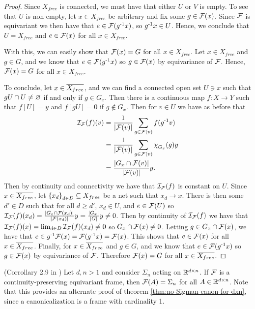 \begin{theorem}
\begin{proof}
        Since $X_{free}$ is connected, we must have that either $U$ or $V$ is empty.
        To see that $U$ is non-empty, let $x \in X_{free}$ be arbitrary and fix some $g \in \mathcal{F}(x)$.
        Since $\mathcal{F}$ is equivariant we then have that $e \in \mathcal{F}(g^{\text{-}1} x)$, so $g^{\text{-}1} x \in U$.
        Hence, we conclude that $U = X_{free}$ and $e \in \mathcal{F}(x)$ for all $x \in X_{free}$.
        
        With this, we can easily show that $\mathcal{F}(x) = G$ for all $x \in X_{free}$.
        Let $x \in X_{free}$ and $g \in G$, and we know that $e \in \mathcal{F}(g^{\text{-}1} x)$ so $g \in \mathcal{F}(x)$ by equivariance of $\mathcal{F}$.
        Hence, $\mathcal{F}(x) = G$ for all $x \in X_{free}$.
        
        To conclude, let $x \in \overline{X_{free}}$, and we can find a connected open set $U \ni x$ such that $gU \cap U \neq \varnothing$ if and only if $g \in G_x$.
        Then there is a continuous map $f : X \to Y$ such that $f[U] = y$ and $f[gU] = 0$ if $g \not\in G_x$.
        Then for $v \in U$ we have as before that
        \begin{align*}
            \mathcal{I}_{\mathcal{F}} (f) (v)
            &= \frac{1}{\left| \mathcal{F}(v) \right|} \sum_{g \in \mathcal{F}(v)} f(g^{\text{-}1} v) \\
            &= \frac{1}{\left| \mathcal{F}(v) \right|} \sum_{g \in \mathcal{F}(v)} \operatorname{\chi}_{G_x}(g) y \\
            &= \frac{\left| G_x \cap \mathcal{F}(v) \right|}{\left| \mathcal{F}(v) \right|} y.
        \end{align*}
        Then by continuity and connectivity we have that $\mathcal{I}_{\mathcal{F}} (f)$ is constant on $U$.
        Since $x \in \overline{X_{free}}$, let $\left\{ x_d \right\}_{d \in D} \subseteq X_{free}$ be a net such that $x_d \to x$.
        There is then some $d' \in D$ such that for all $d \geq d'$, $x_d \in U$, and $e \in \mathcal{F}(U)$ so $\mathcal{I}_{\mathcal{F}} (f) (x_d) = \frac{\left| G_x \cap \mathcal{F}(x_d) \right|}{\left| \mathcal{F}(x_d) \right|}y = \frac{\left| G_x \right|}{\left| G \right|}y \neq 0$.
        Then by continuity of $\mathcal{I}_{\mathcal{F}} (f)$ we have that $\mathcal{I}_{\mathcal{F}} (f) (x) = \lim_{d \in D} \mathcal{I}_{\mathcal{F}} (f) (x_d) \neq 0$ so $G_x \cap \mathcal{F}(x) \neq 0$.
        Letting $g \in G_x \cap \mathcal{F}(x)$, we have that $e \in g^{\text{-}1}\mathcal{F}(x) = \mathcal{F}(g^{\text{-}1}x) = \mathcal{F}(x)$.
        This shows that $e \in \mathcal{F}(x)$ for all $x \in \overline{X_{free}}$.
        Finally, for $x \in \overline{X_{free}}$ and $g \in G$, and we know that $e \in \mathcal{F}(g^{\text{-}1} x)$ so $g \in \mathcal{F}(x)$ by equivariance of $\mathcal{F}$.
        Therefore $\mathcal{F}(x) = G$ for all $x \in \overline{X_{free}}$.
    \end{proof}
\end{theorem}

\begin{corollary}
    (Corrollary 2.9 in \cite{dym2024equivariant})
    Let $d,n > 1$ and consider $\Sigma_n$ acting on $\mathbb{R}^{d \times n}$.
    If $\mathcal{F}$ is a continuity-preserving equivariant frame, then $\mathcal{F}(A) = \Sigma_n$ for all $A \in \mathbb{R}^{d \times n}$.
    Note that this provides an alternate proof of theorem \ref{thm:no-Sigman-canon-for-dxn}, since a canonicalization is a frame with cardinality 1.
\end{corollary}

